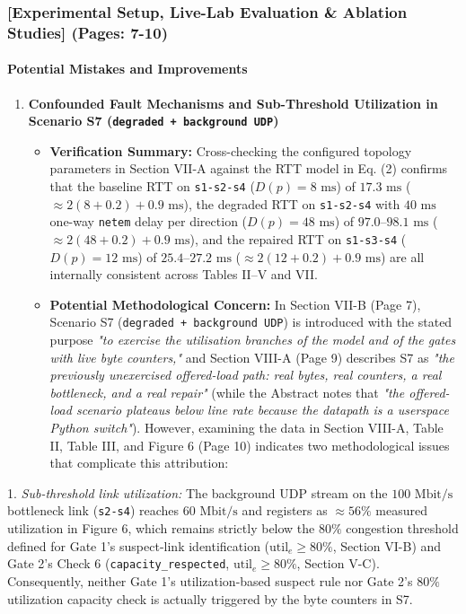 \documentclass[11pt,a4paper]{article}
\begin{document}
\begin{enumerate}[leftmargin=1.6em,itemsep=3pt]
\end{enumerate}
\subsubsection*{[Experimental Setup, Live-Lab Evaluation \& Ablation Studies] (Pages: 7-10)}
\paragraph{Potential Mistakes and Improvements}
\begin{enumerate}[leftmargin=1.6em,itemsep=3pt]
\item \textbf{Confounded Fault Mechanisms and Sub-Threshold Utilization in Scenario S7 (\texttt{degraded + background UDP})}
\begin{itemize}[leftmargin=1.8em,itemsep=2pt]
\item \textbf{Verification Summary:} Cross-checking the configured topology parameters in Section VII-A against the RTT model in Eq. (2) confirms that the baseline RTT on \texttt{s1-s2-s4} ($D(p) = 8\text{ ms}$) of $17.3\text{ ms}$ ($\approx 2(8 + 0.2) + 0.9\text{ ms}$), the degraded RTT on \texttt{s1-s2-s4} with $40\text{ ms}$ one-way \texttt{netem} delay per direction ($D(p) = 48\text{ ms}$) of $97.0\text{--}98.1\text{ ms}$ ($\approx 2(48 + 0.2) + 0.9\text{ ms}$), and the repaired RTT on \texttt{s1-s3-s4} ($D(p) = 12\text{ ms}$) of $25.4\text{--}27.2\text{ ms}$ ($\approx 2(12 + 0.2) + 0.9\text{ ms}$) are all internally consistent across Tables II–V and VII.
\item \textbf{Potential Methodological Concern:} In Section VII-B (Page 7), Scenario S7 (\texttt{degraded + background UDP}) is introduced with the stated purpose \emph{"to exercise the utilisation branches of the model and of the gates with live byte counters,"} and Section VIII-A (Page 9) describes S7 as \emph{"the previously unexercised offered-load path: real bytes, real counters, a real bottleneck, and a real repair"} (while the Abstract notes that \emph{"the offered-load scenario plateaus below line rate because the datapath is a userspace Python switch"}). However, examining the data in Section VIII-A, Table II, Table III, and Figure 6 (Page 10) indicates two methodological issues that complicate this attribution:
\end{itemize}
\end{enumerate}
1. \emph{Sub-threshold link utilization:} The background UDP stream on the $100\text{ Mbit/s}$ bottleneck link (\texttt{s2-s4}) reaches $60\text{ Mbit/s}$ and registers as $\approx 56\%$ measured utilization in Figure 6, which remains strictly below the $80\%$ congestion threshold defined for Gate 1's suspect-link identification ($\text{util}_e \ge 80\%$, Section VI-B) and Gate 2's Check 6 (\texttt{capacity\_respected}, $\text{util}_e \ge 80\%$, Section V-C). Consequently, neither Gate 1's utilization-based suspect rule nor Gate 2's $80\%$ utilization capacity check is actually triggered by the byte counters in S7.
\end{document}
